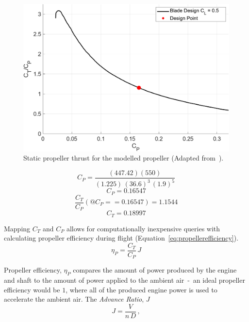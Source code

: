 \begin{figure}[!ht]\label{fig:staticpropthrust}
    \centering
    \includegraphics[width=0.85\linewidth]{Figures/StaticThrust.png}
    \caption{Static propeller thrust for the modelled propeller (Adapted from~\cite{GeneralizedMethodPropeller}).}
\end{figure}

\begin{equation}\label{eq:calcCT1}
    C_P = \frac{(447.42)(550)}{{(1.225)} \, {(36.6)}^3 \, {(1.9)}^5}
\end{equation}
\begin{equation}\label{eq:calcCT2}
    C_P = 0.16547
\end{equation}
\begin{equation}\label{eq:calcCT3}
    \frac{C_T}{C_P}(@C_P == 0.16547) = 1.1544
\end{equation}
\begin{equation}\label{eq:calcCT4}
    C_T = 0.18997
\end{equation}


Mapping \(C_T\) and \(C_P\) allows for computationally inexpensive queries with calculating propeller efficiency during flight (Equation~\ref{eq:propellerefficiency}).
\begin{equation}\label{eq:propellerefficiency}
    \eta_P = \frac{C_T}{C_P} \, J
\end{equation}

Propeller efficiency, \( \eta_P \) compares the amount of power produced by the engine and shaft to the amount of power applied to the ambient air~-~an ideal propeller efficiency would be \(1\), where all of the produced engine power is used to accelerate the ambient air. The \textit{Advance Ratio}, \(J\)
\begin{equation}\label{eq:advanceRatio}
    J = \frac{V}{n \, D} \, ,
\end{equation}

